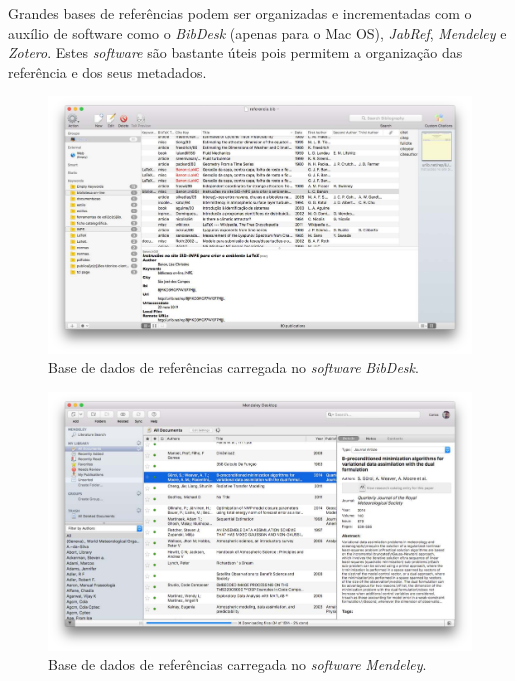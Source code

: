 Grandes bases de referências podem ser organizadas e incrementadas com o auxílio de software como o \textit{BibDesk} (apenas para o Mac OS), \textit{JabRef}, \textit{Mendeley} e \textit{Zotero}. Estes \textit{software} são bastante úteis pois permitem a organização das referência e dos seus metadados.

\begin{figure}[H]
\caption{Base de dados de referências carregada no \textit{software} \textit{BibDesk}.}
\vspace{6mm}
    \begin{center}
        \includegraphics[scale=0.25]{./figs/bibdesk.pdf}
    \end{center}
\vspace{4mm}
\label{fig:exe_bibdesk}
\end{figure}

\begin{figure}[H]
\caption{Base de dados de referências carregada no \textit{software} \textit{Mendeley}.}
\vspace{6mm}
    \begin{center}
        \includegraphics[scale=0.25]{./figs/mendeley.pdf}
    \end{center}
\vspace{4mm}
\label{fig:exe_mendeley}
\end{figure}

